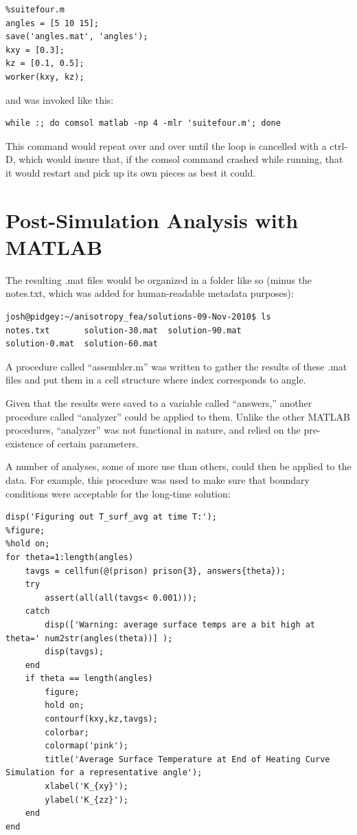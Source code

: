 \small
\begin{verbatim}
%suitefour.m
angles = [5 10 15];
save('angles.mat', 'angles');
kxy = [0.3];
kz = [0.1, 0.5];
worker(kxy, kz);
\end{verbatim}
\normalsize 

and was invoked like this:

\small
\begin{verbatim}
while :; do comsol matlab -np 4 -mlr 'suitefour.m'; done
\end{verbatim}
\normalsize

This command would repeat over and over until the loop is cancelled with a
ctrl-D, which would insure that, if the comsol command crashed while running,
that it would restart and pick up its own pieces as best it could.

\section{Post-Simulation Analysis with MATLAB}

The resulting .mat files would be organized in a folder like so (minus the
notes.txt, which was added for human-readable metadata purposes):

\small
\begin{verbatim}
josh@pidgey:~/anisotropy_fea/solutions-09-Nov-2010$ ls
notes.txt       solution-30.mat  solution-90.mat
solution-0.mat  solution-60.mat

\end{verbatim}
\normalsize

A procedure called ``assembler.m'' was written to gather the results of these
.mat files and put them in a cell structure where index corresponds to
angle.

Given that the results were saved to a variable called ``answers,'' another
procedure called ``analyzer'' could be applied to them.  Unlike the other
MATLAB procedures, ``analyzer'' was not functional in nature, and relied on
the pre-existence of certain parameters.

A number of analyses, some of more use than others, could then be applied to the
data. For example, this procedure was used to make sure that boundary conditions
were acceptable for the long-time solution:


\small
\begin{verbatim}
disp('Figuring out T_surf_avg at time T:');
%figure;
%hold on;
for theta=1:length(angles)
    tavgs = cellfun(@(prison) prison{3}, answers{theta});
    try
        assert(all(all(tavgs< 0.001)));
    catch
        disp(['Warning: average surface temps are a bit high at theta=' num2str(angles(theta))] );
        disp(tavgs);
    end
    if theta == length(angles)
        figure;
        hold on;
        contourf(kxy,kz,tavgs);
        colorbar;
        colormap('pink');
        title('Average Surface Temperature at End of Heating Curve Simulation for a representative angle');
        xlabel('K_{xy}');
        ylabel('K_{zz}');
    end
end
\end{verbatim}
\normalsize

